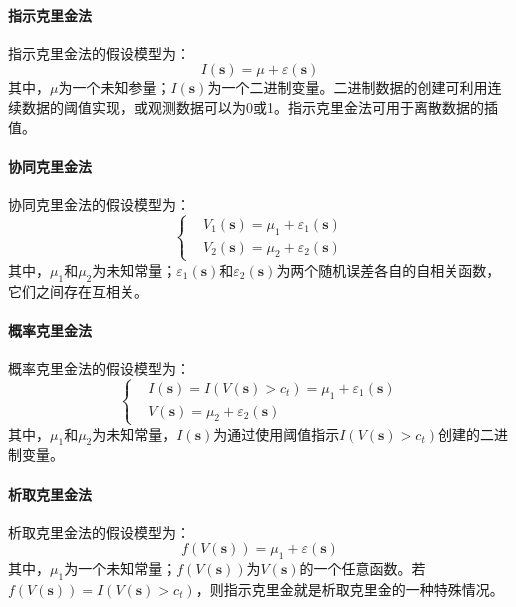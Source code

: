 \paragraph{指示克里金法}
指示克里金法的假设模型为：
\begin{equation}
    I\left( \mathbf{s} \right) = \mu + \varepsilon\left( \mathbf{s} \right)
\end{equation}
其中，$ \mu $为一个未知参量；$ I\left( \mathbf{s} \right) $为一个二进制变量。二进制数据的创建可利用连续数据的阈值实现，或观测数据可以为0或1。指示克里金法可用于离散数据的插值。
\paragraph{协同克里金法}
协同克里金法的假设模型为：
\begin{equation}
    \left\{
    \begin{aligned}
         & V_{1}\left( \mathbf{s} \right) = \mu_{1} + \varepsilon_{1}\left( \mathbf{s} \right) \\
         & V_{2}\left( \mathbf{s} \right) = \mu_{2} + \varepsilon_{2}\left( \mathbf{s} \right)
    \end{aligned}
    \right.
\end{equation}
其中，$ \mu_{1} $和$ \mu_{2} $为未知常量；$ \varepsilon_{1}\left( \mathbf{s} \right) $和$ \varepsilon_{2}\left( \mathbf{s} \right) $为两个随机误差各自的自相关函数，它们之间存在互相关。
\paragraph{概率克里金法}
概率克里金法的假设模型为：
\begin{equation}
    \left\{
    \begin{aligned}
         & I\left( \mathbf{s} \right) = I\left( V\left( \mathbf{s} \right) > c_{t} \right) = \mu_{1} + \varepsilon_{1}\left( \mathbf{s} \right) \\
         & V\left( \mathbf{s} \right) = \mu_{2} + \varepsilon_{2}\left( \mathbf{s} \right)
    \end{aligned}
    \right.
\end{equation}
其中，$ \mu_{1} $和$ \mu_{2} $为未知常量，$ I\left( \mathbf{s} \right) $为通过使用阈值指示$ I\left( V\left( \mathbf{s} \right) > c_{t} \right) $创建的二进制变量。
\paragraph{析取克里金法}
析取克里金法的假设模型为：
\begin{equation}
    f\left( V\left( \mathbf{s} \right) \right) = \mu_{1} + \varepsilon\left( \mathbf{s} \right)
\end{equation}
其中，$ \mu_{1} $为一个未知常量；$ f\left( V\left( \mathbf{s} \right) \right) $为$ V\left( \mathbf{s} \right) $的一个任意函数。若$ f\left( V\left( \mathbf{s} \right) \right) = I\left( V\left( \mathbf{s} \right) > c_{t} \right) $，则指示克里金就是析取克里金的一种特殊情况。